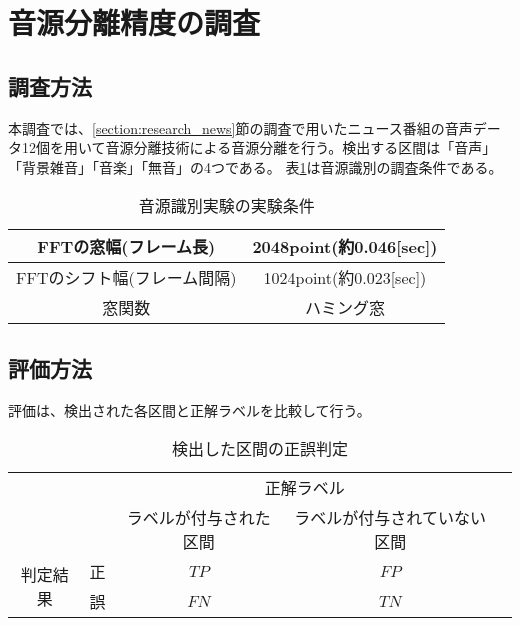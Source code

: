 \section{音源分離精度の調査}
\label{section:devide_audio}


\subsection{調査方法}
本調査では、\ref{section:research_news}節の調査で用いたニュース番組の音声データ12個を用いて音源分離技術による音源分離を行う。検出する区間は「音声」「背景雑音」「音楽」「無音」の4つである。
表\ref{table:detail_identification_method1}は音源識別の調査条件である。

\begin{table}[H]
  \begin{center}
    \caption{音源識別実験の実験条件 \label{table:detail_identification_method1}}
    \begin{tabular}{|c||c|} \hline
      FFTの窓幅(フレーム長) & 2048point(約0.046[sec])   \\ \hline
      FFTのシフト幅(フレーム間隔) &  1024point(約0.023[sec]) \\ \hline
      窓関数 & ハミング窓  \\ \hline
    \end{tabular}
  \end{center}
\end{table}

\subsection{評価方法}
評価は、検出された各区間と正解ラベルを比較して行う。

\begin{table}[H]
\begin{center}
    \caption{検出した区間の正誤判定 \label{table:search_table_ap}}
\begin{tabular}{|c|c|c|c|l}
\cline{1-4}
\multicolumn{2}{|c|}{\multirow{2}{*}{}} & \multicolumn{2}{c|}{正解ラベル} &  \\ \cline{3-4}
\multicolumn{2}{|c|}{}                  & ラベルが付与された区間        &    ラベルが付与されていない区間     &  \\ \cline{1-4}
\multirow{2}{*}{判定結果}        & 正        & $TP$                  & $FP$                   &  \\ \cline{2-4}
& 誤        & $FN$                  & $TN$                   &  \\ \cline{1-4}
\end{tabular}
\end{center}
\end{table}

